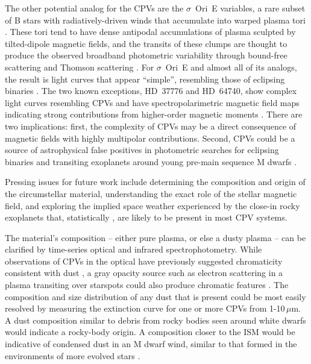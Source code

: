 \documentclass{nature3}
\begin{document}
The other potential analog for the CPVs are the $\sigma$~Ori~E
variables, a rare subset of B stars with radiatively-driven winds
that accumulate into
warped plasma tori \cite{Townsend2005,Townsend2008}.  These tori tend
to have dense antipodal accumulations of plasma sculpted by
tilted-dipole magnetic fields, and the transits of
these clumps are thought to produce the observed broadband photometric variability
through bound-free scattering \cite{Townsend2005} and
Thomson scattering \cite{Berry2022}.  For $\sigma$~Ori~E and almost
all of its analogs, the result is light curves that appear ``simple'',
resembling those of eclipsing binaries \cite{Townsend2008}.  The two known
exceptions, HD~37776 and HD~64740, show complex light curves
resembling CPVs \cite{Mikulasek2020,Bouma2024} and have
spectropolarimetric magnetic field maps indicating strong
contributions from higher-order magnetic moments
\cite{Kochukhov2011,Shultz2018}.  There are two implications: first,
the complexity of CPVs may be a direct consequence of magnetic fields
with highly multipolar contributions.  Second, CPVs could be a
source of astrophysical false positives in photometric searches for
eclipsing binaries and transiting exoplanets around young
pre-main sequence M dwarfs \cite{Johns-Krull2016,Bouma2020}.

Pressing issues for future work include determining the composition
and origin of the circumstellar material, understanding the exact role
of the stellar magnetic field, and exploring the implied space weather
experienced by the close-in rocky exoplanets that, statistically
\cite{Dressing2015}, are likely to be present in most CPV systems.

The material's composition -- either pure plasma, or else a dusty
plasma -- can be clarified by time-series optical and infrared
spectrophotometry.  While observations of CPVs in the optical have
previously suggested chromaticity consistent with dust \cite{Tanimoto2020,Gunther2022,Koen2023},
a gray opacity source such as electron scattering in a plasma
transiting over starspots could also produce chromatic features
\cite{Rackham2018}.  The composition and size distribution of any dust
that is present could be most easily resolved by measuring the
extinction curve for one or more CPVs from 1-10\,$\mu$m.  A
dust composition similar to debris from rocky bodies seen around white
dwarfs \cite{Reach2009} would indicate a rocky-body origin.  A 
composition closer to the ISM would be indicative of condensed dust in
an M dwarf wind, similar to that formed in the environments of more
evolved stars \cite{Marigo2008}.
\end{document}

